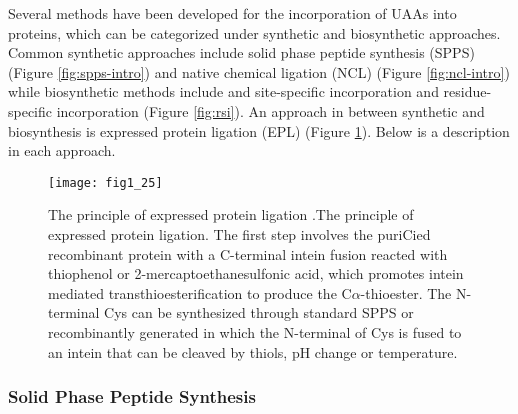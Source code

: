 \begin{refsection}
Several methods have been developed for the incorporation of UAAs into
proteins, which can be categorized under synthetic and biosynthetic approaches.
Common synthetic approaches include solid phase peptide synthesis (SPPS)
(Figure \ref{fig:spps-intro}) and native chemical ligation (NCL) (Figure
\ref{fig:ncl-intro}) while biosynthetic methods include  and
 site-specific incorporation \cite{Cellitti2008,Hassan2008} and
residue-specific incorporation \cite{Johnson2010} (Figure \ref{fig:rsi}). An
approach in between synthetic and biosynthesis is expressed protein ligation
(EPL) \cite{Muir1998} (Figure \ref{fig:epl-intro}). Below is a description in
each approach.
\begin{figure}[h!] \centering \texttt{[image: fig1\_25]}
    \caption[The principle of expressed protein ligation. The first step
        involves the puriCied recombinant protein with a C-terminal intein
        fusion reacted with thiophenol or 2-mercaptoethanesulfonic acid, which
        promotes intein mediated transthioesterification to produce the
        C$\alpha$-thioester. The N-terminal Cys can be synthesized through
        standard SPPS or recombinantly generated in which the N-terminal of Cys
        is fused to an intein that can be cleaved by thiols, pH change or
    temperature.]{The principle of expressed protein ligation
        \cite{Muir1998,Theato2013}.The principle of expressed protein ligation. The first
        step involves the puriCied recombinant protein with a C-terminal intein
        fusion reacted with thiophenol or 2-mercaptoethanesulfonic acid, which
        promotes intein mediated transthioesterification to produce the
        C$\alpha$-thioester. The N-terminal Cys can be synthesized through
        standard SPPS or recombinantly generated in which the N-terminal of Cys
        is fused to an intein that can be cleaved by thiols, pH change or
    temperature.} 
    \label{fig:epl-intro} 
\end{figure}

\subsubsection{Solid Phase Peptide Synthesis}


\end{refsection}
